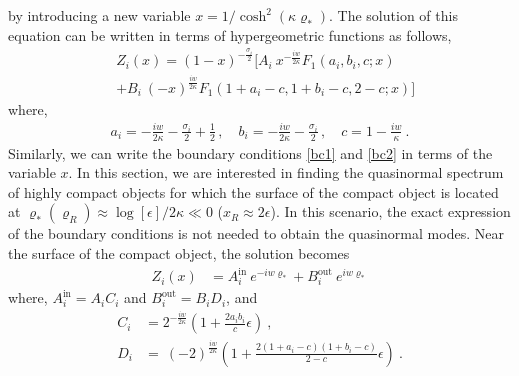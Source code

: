 \documentclass[aps,prd,twocolumn,floatfix,noshowpacs,tightenlines,noshowkeys,superscriptaddress,amsmath,amssymb,
nofootinbib]{revtex4-1}
\renewcommand\[{\begin{equation}}
\renewcommand\]{\end{equation}}
\def\ro{\varrho}
\begin{document}
by introducing a new variable $x=1/\cosh^2{(\kappa \ro_{*})}$. The solution of this equation can be written in terms of hypergeometric functions as follows,
\begin{equation}\label{NE_sol}
\begin{aligned}
&Z_i(x)=(1-x)^{-\frac{\sigma_i}{2}}\bigg[A_i~x^{-\frac{i w}{2\kappa}}F_{1}(a_i,b_i,c;x)\\&+B_i~ (-x)^{\frac{i w}{2\kappa}}F_{1}(1+a_i-c,1+b_i-c,2-c;x)\bigg]
\end{aligned}
\end{equation}
where, 
\begin{equation}\label{a_b_c}
\begin{aligned}
a_i=-\frac{i w}{2\kappa}-\frac{\sigma_i}{2}+\frac{1}{2}\,,\quad{b_i}=-\frac{i w}{2\kappa}-\frac{\sigma_i}{2}\,,\quad{c}=1-\frac{i w}{\kappa}~.\nonumber
\end{aligned}
\end{equation}
Similarly, we can write the boundary conditions \autoref{bc1} and \autoref{bc2} in terms of the variable $x$. In this section, we are interested in finding the quasinormal spectrum of highly compact objects for which the surface of the compact object is located at $\ro_{*}(\ro_R)\approx\log[\epsilon]/2\kappa\ll 0$ ($x_R\approx 2\epsilon$). In this scenario, the exact expression of the boundary conditions is not needed to obtain the quasinormal modes. Near the surface of the compact object, the solution becomes
\begin{equation}\label{NE_NH}
	\begin{aligned}
		Z_i(x)&=A_i^{\textrm{in}}~e^{-i w \ro_{*}}+B_i^{\textrm{out}}~e^{i w \ro_{*}}
	\end{aligned}
\end{equation}
where, $A_i^{\textrm{in}}=A_i C_i$ and $B_i^{\textrm{out}}=B_i D_i$, and
\begin{equation}\label{NE_NH1}
	\begin{aligned}
C_i&=2^{-\frac{i w}{2\kappa}}(1+\frac{2a_i b_i}{c}\epsilon)~,\\D_i&=~ (-2)^{\frac{i w}{2\kappa}}\left(1+\frac{2(1+a_i-c) (1+b_i-c)}{2-c}\epsilon\right)~.
	\end{aligned}
\end{equation}
\end{document}
